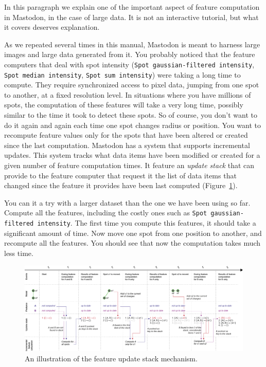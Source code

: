 In this paragraph we explain one of the important aspect of feature computation in Mastodon, in the case of large data.
It is not an interactive tutorial, but what it covers deserves explanation. 

As we repeated several times in this manual, Mastodon is meant to harness large images and large data generated from it. 
You probably noticed that the feature computers that deal with spot intensity (\texttt{Spot gaussian-filtered intensity}, \texttt{Spot median intensity}, \texttt{Spot sum intensity}) were taking a long time to compute. 
They require synchronized access to pixel data, jumping from one spot to another, at a fixed resolution level.
In situations where you have millions of spots, the computation of these features will take a very long time, possibly similar to the time it took to detect these spots. 
So of course, you don't want to do it again and again each time one spot changes radius or position.
You want to recompute feature values only for the spots that have been altered or created since the last computation. 
Mastodon has a system that supports incremental updates. 
This system tracks what data items have been modified or created for a given number of feature computation times. 
It feature an \textit{update stack} that can provide to the feature computer that request it the list of data items that changed since the feature it provides have been last computed (Figure~\ref{fig:FeatureUpdateStack}). 

You can it a try with a larger dataset than the one we have been using so far.
Compute all the features, including the costly ones such as \texttt{Spot gaussian-filtered intensity}.
The first time you compute this features, it should take a significant amount of time.
Now move one spot from one position to another, and recompute all the features. 
You should see that now the computation takes much less time.

\begin{figure}
    \centering
    \includegraphics[angle=90, height=0.8\textheight]{figures/Mastodon_FeatureUpdateStack.png}
    \caption{An illustration of the feature update stack mechanism.  }
    \label{fig:FeatureUpdateStack}
\end{figure}


